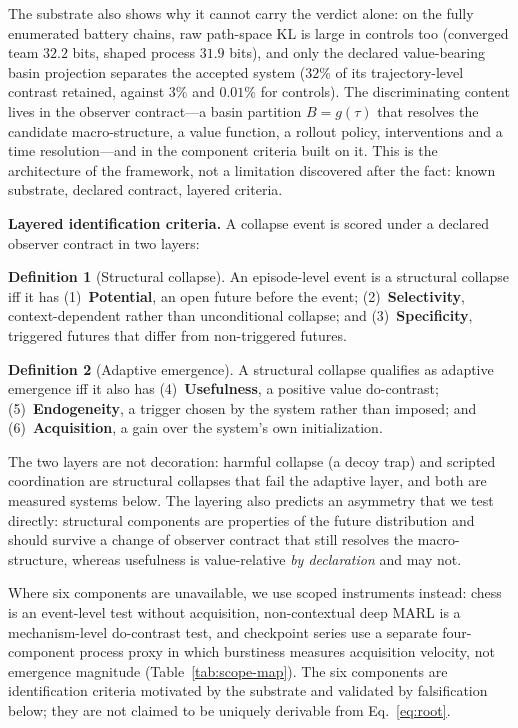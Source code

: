 \documentclass[11pt]{article}
\theoremstyle{definition}
\newtheorem{definition}{Definition}
\begin{document}
The substrate also shows why it cannot carry the verdict alone: on the
fully enumerated battery chains, raw path-space KL is large in controls
too (converged team $32.2$ bits, shaped process $31.9$ bits), and only
the declared value-bearing basin projection separates the accepted
system ($32\%$ of its trajectory-level contrast retained, against
$3\%$ and $0.01\%$ for controls). The discriminating content lives in
the observer contract---a basin partition $B=g(\tau)$ that resolves the
candidate macro-structure, a value function, a rollout policy,
interventions and a time resolution---and in the component criteria
built on it. This is the architecture of the framework, not a
limitation discovered after the fact: known substrate, declared
contract, layered criteria.

\textbf{Layered identification criteria.}
A collapse event is scored under a declared observer contract in two
layers:
\begin{definition}[Structural collapse]
\label{def:structural}
An episode-level event is a structural collapse iff it has
(1)~\textbf{Potential}, an open future before the event;
(2)~\textbf{Selectivity}, context-dependent rather than unconditional
collapse; and
(3)~\textbf{Specificity}, triggered futures that differ from
non-triggered futures.
\end{definition}
\begin{definition}[Adaptive emergence]
\label{def:criterion}
A structural collapse qualifies as adaptive emergence iff it also has
(4)~\textbf{Usefulness}, a positive value do-contrast;
(5)~\textbf{Endogeneity}, a trigger chosen by the system rather than
imposed; and (6)~\textbf{Acquisition}, a gain over the system's own
initialization.
\end{definition}
The two layers are not decoration: harmful collapse (a decoy trap) and
scripted coordination are structural collapses that fail the adaptive
layer, and both are measured systems below. The layering also predicts
an asymmetry that we test directly: structural components are
properties of the future distribution and should survive a change of
observer contract that still resolves the macro-structure, whereas
usefulness is value-relative \emph{by declaration} and may not.

Where six components are unavailable, we use scoped instruments
instead: chess is an event-level test without acquisition,
non-contextual deep MARL is a mechanism-level do-contrast test, and
checkpoint series use a separate four-component process proxy in which
burstiness measures acquisition velocity, not emergence magnitude
(Table~\ref{tab:scope-map}). The six components are identification
criteria motivated by the substrate and validated by falsification
below; they are not claimed to be uniquely derivable from
Eq.~\eqref{eq:root}.
\end{document}
